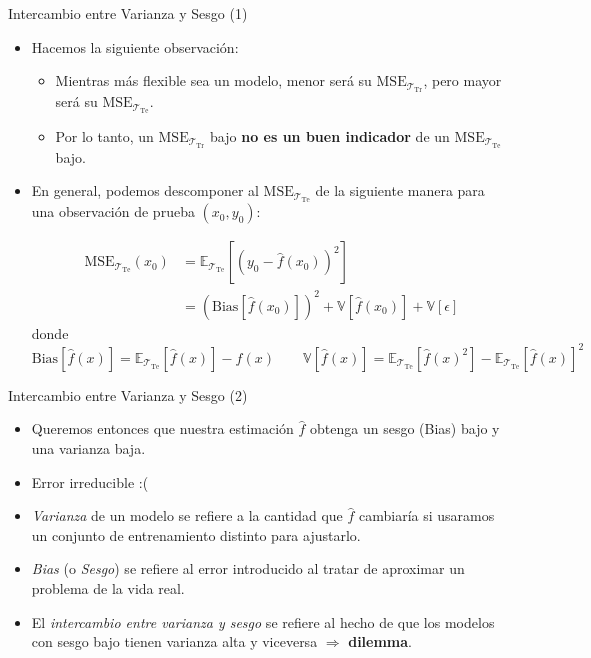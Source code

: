 \documentclass[usenames,dvipsnames]{beamer} %
\newcommand\defi[1]{\textcolor{NavyBlue}{\textit{#1}}}
\begin{document}
\begin{frame}{Intercambio entre Varianza y Sesgo (1)}
	\begin{itemize}
		\item Hacemos la siguiente observaci\'on:
		\begin{itemize}
			\item Mientras m\'as flexible sea un modelo, menor ser\'a su $\text{MSE}_{\mathcal{T}_{\text{Tr}}}$, pero mayor ser\'a su $\text{MSE}_{\mathcal{T}_{\text{Te}}}$.
			\item Por lo tanto, un $\text{MSE}_{\mathcal{T}_{\text{Tr}}}$ bajo \textbf{no es un buen indicador} de un $\text{MSE}_{\mathcal{T}_{\text{Te}}}$ bajo.
		\end{itemize}
	\item En general, podemos descomponer al $\text{MSE}_{\mathcal{T}_{\text{Te}}}$ de la siguiente manera para una observaci\'on de prueba $(x_0, y_0)$:
	
	\begin{align}
		\text{MSE}_{\mathcal{T}_{\text{Te}}}(x_0)&=\mathbb{E}_{\mathcal{T}_{\text{Te}}}[(y_0 - \hat{f}(x_0))^2]\\
		&= (\text{Bias}[\hat{f}(x_0)])^2 + \mathbb{V}[\hat{f}(x_0)] + \mathbb{V}[\epsilon]
	\end{align}
	donde \[\text{Bias}[\hat{f}(x)]=\mathbb{E}_{\mathcal{T}_{\text{Te}}}[\hat{f}(x)] - f(x) \qquad \mathbb{V}[\hat{f}(x)] = \mathbb{E}_{\mathcal{T}_{\text{Te}}}[\hat{f}(x)^2] - \mathbb{E}_{\mathcal{T}_{\text{Te}}}[\hat{f}(x)]^2 \]
	\end{itemize}
\end{frame}

\begin{frame}{Intercambio entre Varianza y Sesgo (2)}
\begin{itemize}
	\item Queremos entonces que nuestra estimaci\'on $\hat{f}$ obtenga un sesgo (Bias) bajo y una varianza baja.
	\item Error irreducible :(
	\item \defi{Varianza} de un modelo se refiere a la cantidad que $\hat{f}$ cambiar\'ia si usaramos un conjunto de entrenamiento distinto para ajustarlo.
	\item \defi{Bias} (o \defi{Sesgo}) se refiere al error introducido al tratar de aproximar un problema de la vida real.
	\item El \defi{intercambio entre varianza y sesgo} se refiere al hecho de que los modelos con sesgo bajo tienen varianza alta y viceversa $\Rightarrow$ \textbf{dilemma}.
\end{itemize}
\end{frame}
\end{document}
